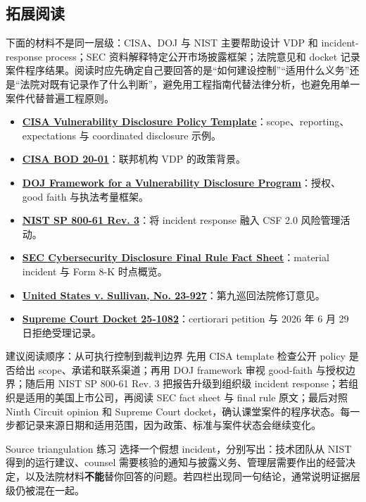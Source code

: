 \subsection{拓展阅读}

下面的材料不是同一层级：CISA、DOJ 与 NIST 主要帮助设计 VDP 和 incident-response process；SEC 资料解释特定公开市场披露框架；法院意见和 docket 记录案件程序结果。阅读时应先确定自己要回答的是“如何建设控制”“适用什么义务”还是“法院对既有记录作了什么判断”，避免用工程指南代替法律分析，也避免用单一案件代替普遍工程原则。

{\small
\begin{itemize}[nosep,leftmargin=*]
  \item \href{https://www.cisa.gov/vulnerability-disclosure-policy-template}{\textbf{CISA Vulnerability Disclosure Policy Template}}：scope、reporting、expectations 与 coordinated disclosure 示例。
  \item \href{https://www.cisa.gov/news-events/directives/bod-20-01-develop-and-publish-vulnerability-disclosure-policy}{\textbf{CISA BOD 20-01}}：联邦机构 VDP 的政策背景。
  \item \href{https://www.justice.gov/criminal/criminal-ccips/page/file/983996/dl}{\textbf{DOJ Framework for a Vulnerability Disclosure Program}}：授权、good faith 与执法考量框架。
  \item \href{https://csrc.nist.gov/pubs/sp/800/61/r3/final}{\textbf{NIST SP 800-61 Rev. 3}}：将 incident response 融入 CSF 2.0 风险管理活动。
  \item \href{https://www.sec.gov/files/33-11216-fact-sheet.pdf}{\textbf{SEC Cybersecurity Disclosure Final Rule Fact Sheet}}：material incident 与 Form 8-K 时点概览。
  \item \href{https://cdn.ca9.uscourts.gov/datastore/opinions/2025/11/12/23-927.pdf}{\textbf{United States v. Sullivan, No. 23-927}}：第九巡回法院修订意见。
  \item \href{https://www.supremecourt.gov/docket/docketfiles/html/public/25-1082.html}{\textbf{Supreme Court Docket 25-1082}}：certiorari petition 与 2026 年 6 月 29 日拒绝受理记录。
\end{itemize}
}

\begin{knowledgebox}{建议阅读顺序：从可执行控制到裁判边界}
先用 CISA template 检查公开 policy 是否给出 scope、承诺和联系渠道；再用 DOJ framework 审视 good-faith 与授权边界；随后用 NIST SP 800-61 Rev. 3 把报告升级到组织级 incident response；若组织是适用的美国上市公司，再阅读 SEC fact sheet 与 final rule 原文；最后对照 Ninth Circuit opinion 和 Supreme Court docket，确认课堂案件的程序状态。每一步都记录来源日期和适用范围，因为政策、标准与案件状态会继续变化。
\end{knowledgebox}

\begin{importantbox}{Source triangulation 练习}
选择一个假想 incident，分别写出：技术团队从 NIST 得到的运行建议、counsel 需要核验的通知与披露义务、管理层需要作出的经营决定，以及法院材料\textbf{不能}替你回答的问题。若四栏出现同一句结论，通常说明证据层级仍被混在一起。
\end{importantbox}


